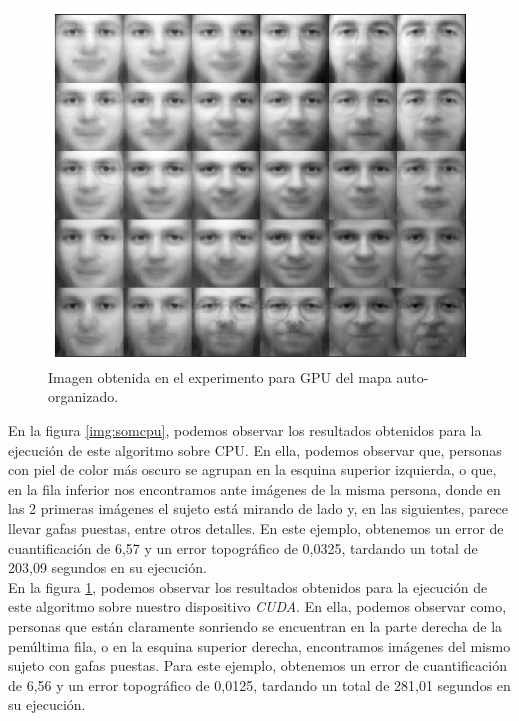 \begin{figure}[ht]
\centering
\includegraphics[scale=0.3]{imagenes/facesgpu.png}
\caption{Imagen obtenida en el experimento para GPU del mapa auto-organizado.}
\label{img:somgpu}
\end{figure}

En la figura \ref{img:somcpu}, podemos observar los resultados obtenidos para la ejecución de este algoritmo sobre CPU. En ella, podemos observar que, personas con piel de color más oscuro se agrupan en la esquina superior izquierda, o que, en la fila inferior nos encontramos ante imágenes de la misma persona, donde en las 2 primeras imágenes el sujeto está mirando de lado y, en las siguientes, parece llevar gafas puestas, entre otros detalles. En este ejemplo, obtenemos un error de cuantificación de 6,57 y un error topográfico de 0,0325, tardando un total de 203,09 segundos en su ejecución.\\

En la figura \ref{img:somgpu}, podemos observar los resultados obtenidos para la ejecución de este algoritmo sobre nuestro dispositivo \textit{CUDA}. En ella, podemos observar como, personas que están claramente sonriendo se encuentran en la parte derecha de la penúltima fila, o en la esquina superior derecha, encontramos imágenes del mismo sujeto con gafas puestas. Para este ejemplo, obtenemos un error de cuantificación de 6,56 y un error topográfico de 0,0125, tardando un total de 281,01 segundos en su ejecución.\\
	
